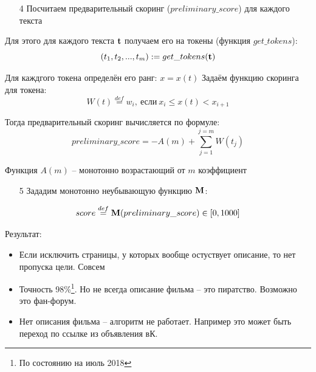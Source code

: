\begin{frame}
	\small
	\begin{enumerate}
		\item[4] Посчитаем предварительный скоринг ($preliminary\_score$) для каждого текста 
	\end{enumerate}
	
	Для этого для каждого текста $\bold t$ получаем его на токены (функция $get\_tokens$):
	\begin{equation}
		\left(t_1, t_2, ..., t_m\right) := get\_tokens (\bold t)
	\end{equation}
	
	Для каждгого токена определён его ранг: $x = x(t)$
	Задаём функцию скоринга для токена:
	\begin{equation}
	W(t) \stackrel{def}{=} w_i, ~\text{если}~ x_{i} \leqslant x(t) < x_{i+1}
	\end{equation}
	
	Тогда предварительный скоринг вычисляется по формуле:
	\begin{equation}
	preliminary\_score = -A(m) + \sum_{j=1}^{j=m} W(t_j)
	\end{equation}
	
	Функция $A(m)$ -- монотонно возрастающий от $m$ коэффициент
\end{frame}

\begin{frame}
	\begin{enumerate}
		\item [5]Зададим монотонно неубывающую функцию $\bold M$:
	\end{enumerate}
	
	\begin{equation}
	score \stackrel{def}{=} \bold M (preliminary\_score) \in [0, 1000]
	\end{equation}
	
	
\end{frame}


\begin{frame}
	Результат:
	\begin{itemize}
		\item Если исключить страницы, у которых вообще остуствует описание, то нет пропуска цели. Совсем
		\item Точность 98\%\footnote{По состоянию на июль 2018}. Но не всегда описание фильма -- это пиратство. Возможно 
		это фан-форум. 
		\item Нет описания фильма -- алгоритм не работает. Например это может быть переход по ссылке из объявления вК.
	\end{itemize}

\end{frame}

